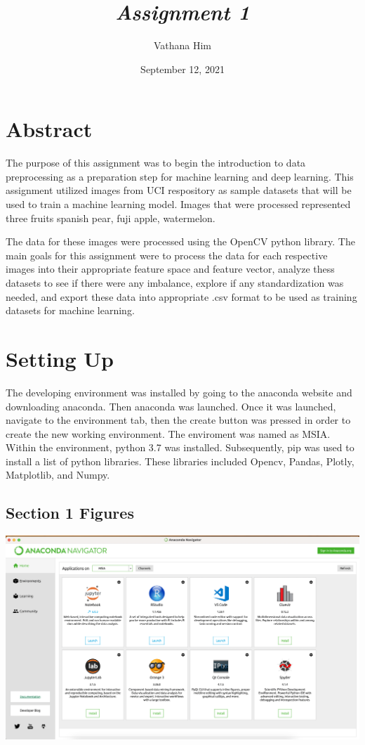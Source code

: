 \documentclass{article}
\title{\Huge \bfseries \emph{Assignment 1}}
\author{Vathana Him}
\date{September 12, 2021}
\begin{document}
\maketitle

\begin{multicols}{2}
	
\section{Abstract}
	The purpose of this assignment was to begin the introduction to data preprocessing as a preparation step for machine learning and deep learning. This assignment utilized images from UCI respository as sample datasets that will be used to train a machine learning model. Images that were processed represented three fruits spanish pear, fuji apple, watermelon. 
	
	The data for these images were processed using the OpenCV python library. The main goals for this assignment were to process the data for each respective images into their appropriate feature space and feature vector, analyze thess datasets to see if there were any imbalance, explore if any standardization was needed, and export these data into appropriate .csv format to be used as training datasets for machine learning.  


\section{Setting Up}
The developing environment was installed by going to the anaconda website and downloading anaconda. Then anaconda was launched. Once it was launched, navigate to the environment tab, then the create button was pressed in order to create the new working environment. The enviroment was named as MSIA. Within the environment, python 3.7 was installed. Subsequently, pip was used to install a list of python libraries. These libraries included Opencv, Pandas, Plotly, Matplotlib, and Numpy.


\subsection{Section 1 Figures} 

	\begin{center}
		\includegraphics[scale=0.1]{../screenshots/environment.png}
		

\end{center}
\end{multicols}
\end{document}
